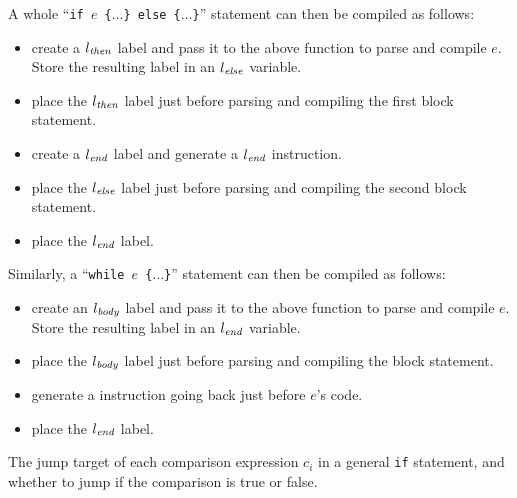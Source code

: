 \noindent A whole ``{\tt if $e$ \{$\ldots$\} else \{$\ldots$\}}'' statement can
then be compiled as follows:

\begin{itemize}
  \item create a $l_{\it{then}}$ label and pass it to the above function to
  parse and compile $e$. Store the resulting label in an $l_{\it{else}}$
  variable.

  \item place the $l_{\it{then}}$ label just before parsing and compiling the
  first block statement.

  \item create a $l_{\it{end}}$ label and generate a 
  $l_{\it{end}}$ instruction.

  \item place the $l_{\it{else}}$ label just before parsing and compiling the
  second block statement.

  \item place the $l_{\it{end}}$ label.
\end{itemize}

\noindent Similarly, a ``{\tt while $e$ \{$\ldots$\}}'' statement can then be
compiled as follows:

\begin{itemize}
  \item create an $l_{\it{body}}$ label and pass it to the above function to
  parse and compile $e$. Store the resulting label in an $l_{\it{end}}$
  variable.

  \item place the $l_{\it{body}}$ label just before parsing and compiling the
  block statement.

  \item generate a  instruction going back just before $e$'s code.

  \item place the $l_{\it{end}}$ label.
\end{itemize}

\begin{Figure}
  

  \caption{The jump target of each comparison expression $c_i$ in a general
  {\tt if} statement, and whether to jump if the comparison is true or
  false.}\label{fig:conditionals}
\end{Figure}

